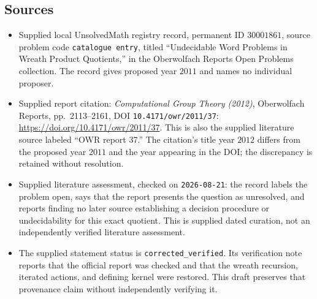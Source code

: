 \documentclass[11pt]{article}
\begin{document}
\subsection{Sources}
\begin{itemize}
\item Supplied local UnsolvedMath registry record, permanent ID \(30001861\), source problem code \texttt{catalogue entry}, titled ``Undecidable Word Problems in Wreath Product Quotients,'' in the Oberwolfach Reports Open Problems collection. The record gives proposed year \(2011\) and names no individual proposer.
\item Supplied report citation: \emph{Computational Group Theory (2012)}, Oberwolfach Reports, pp.~2113--2161, DOI \texttt{10.4171/owr/2011/37}: \url{https://doi.org/10.4171/owr/2011/37}. This is also the supplied literature source labeled ``OWR report 37.'' The citation's title year \(2012\) differs from the proposed year \(2011\) and the year appearing in the DOI; the discrepancy is retained without resolution.
\item Supplied literature assessment, checked on \texttt{2026-08-21}: the record labels the problem open, says that the report presents the question as unresolved, and reports finding no later source establishing a decision procedure or undecidability for this exact quotient. This is supplied dated curation, not an independently verified literature assessment.
\item The supplied statement status is \texttt{corrected\_verified}. Its verification note reports that the official report was checked and that the wreath recursion, iterated actions, and defining kernel were restored. This draft preserves that provenance claim without independently verifying it.
\end{itemize}
\end{document}
